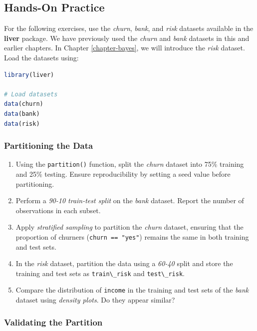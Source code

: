 \documentclass[
  11pt,
]{book}
\newcommand{\passthrough}[1]{#1}
\theoremstyle{definition}
\theoremstyle{definition}
\theoremstyle{definition}
\theoremstyle{definition}
\theoremstyle{remark}
\begin{document}
\subsection*{Hands-On Practice}\label{hands-on-practice}


For the following exercises, use the \emph{churn}, \emph{bank}, and \emph{risk} datasets available in the \textbf{liver} package. We have previously used the \emph{churn} and \emph{bank} datasets in this and earlier chapters. In Chapter \ref{chapter-bayes}, we will introduce the \emph{risk} dataset. Load the datasets using:

\begin{lstlisting}[language=R]
library(liver)

# Load datasets
data(churn)
data(bank)
data(risk)
\end{lstlisting}

\subsubsection*{Partitioning the Data}\label{partitioning-the-data}


\begin{enumerate}
\def\labelenumi{\arabic{enumi}.}
\setcounter{enumi}{14}
\item
  Using the \passthrough{\lstinline!partition()!} function, split the \emph{churn} dataset into 75\% training and 25\% testing. Ensure reproducibility by setting a seed value before partitioning.
\item
  Perform a \emph{90-10 train-test split} on the \emph{bank} dataset. Report the number of observations in each subset.
\item
  Apply \emph{stratified sampling} to partition the \emph{churn} dataset, ensuring that the proportion of churners (\passthrough{\lstinline!churn == "yes"!}) remains the same in both training and test sets.
\item
  In the \emph{risk} dataset, partition the data using a \emph{60-40} split and store the training and test sets as \passthrough{\lstinline!train\_risk!} and \passthrough{\lstinline!test\_risk!}.
\item
  Compare the distribution of \passthrough{\lstinline!income!} in the training and test sets of the \emph{bank} dataset using \emph{density plots}. Do they appear similar?
\end{enumerate}

\subsubsection*{Validating the Partition}\label{validating-the-partition}
\end{document}
